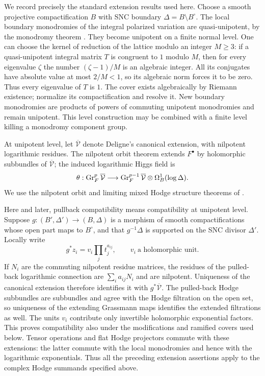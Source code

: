 We record precisely the standard extension results used here.  Choose a
smooth projective compactification $B$ with SNC boundary
$\Delta=B\setminus B^\circ$.  The local boundary monodromies of the
integral polarized variation are quasi-unipotent, by the monodromy theorem
\cite[(6.1), pp.~245--246]{Schmid}.  They become unipotent on a finite normal level.  One
can choose the kernel of reduction of the lattice modulo an integer
$M\geq3$: if a quasi-unipotent integral matrix $T$ is congruent to $1$
modulo $M$, then for every eigenvalue $\zeta$ the number
$(\zeta-1)/M$ is an algebraic integer.  All its conjugates have absolute
value at most $2/M<1$, so its algebraic norm forces it to be zero.
Thus every eigenvalue of $T$ is $1$.  The cover exists algebraically by
Riemann existence; normalize its compactification and resolve it.  New
boundary monodromies are products of powers of commuting unipotent
monodromies and remain unipotent.  This level construction may be combined
with a finite level killing a monodromy component group.

At unipotent level, let $\overline{\mathcal V}$ denote Deligne's canonical
extension, with nilpotent logarithmic residues.  The nilpotent orbit
theorem extends $F^\bullet$ by holomorphic subbundles of
$\overline{\mathcal V}$; the induced logarithmic Higgs field is
\[
 \theta:\operatorname{Gr}_F^p\overline{\mathcal V}\longrightarrow
 \operatorname{Gr}_F^{p-1}\overline{\mathcal V}\otimes\Omega^1_B(\log\Delta).
\]
We use the nilpotent orbit and limiting mixed Hodge structure theorems
of \cite[(4.9), (4.12), and (6.16)]{Schmid}.

Here and later, pullback compatibility means compatibility at unipotent
level.  Suppose $g:(B',\Delta')\to(B,\Delta)$ is a morphism of smooth
compactifications whose open part maps to $B^\circ$, and that
$g^{-1}\Delta$ is supported on the SNC divisor $\Delta'$.  Locally write
\[
 g^*z_i=v_i\prod_j t_j^{a_{ij}},\qquad v_i\ \text{a holomorphic unit}.
\]
If $N_i$ are the commuting nilpotent residue matrices, the residues of the
pulled-back logarithmic connection are $\sum_i a_{ij}N_i$ and are
nilpotent.  Uniqueness of the canonical extension therefore identifies it
with $g^*\overline{\mathcal V}$.  The pulled-back Hodge subbundles are
subbundles and agree with the Hodge filtration on the open set, so
uniqueness of the extending Grassmann maps identifies the extended
filtrations as well.  The units $v_i$ contribute only invertible
holomorphic exponential factors.  This proves compatibility also under
the modifications and ramified covers used below.  Tensor operations and
flat Hodge projectors commute with these extensions: the latter commute
with the local monodromies and hence with the logarithmic exponentials.
Thus all the preceding extension assertions apply to the
complex Hodge summands specified above.

